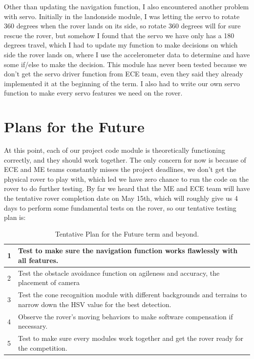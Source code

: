 \documentclass[10pt,letterpaper,onecolumn,draftclsnofoot,journal]{IEEEtran}
\begin{document}
Other than updating the navigation function, I also encountered another problem with servo. Initially in the landonside module, I was letting the servo to rotate 360 degrees when the rover lands on its side, so rotate 360 degrees will for sure rescue the rover, but somehow I found that the servo we have only has a 180 degrees travel, which I had to update my function to make decisions on which side the rover lands on, where I use the accelerometer data to determine and have some if/else to make the decision. This module has never been tested because we don't get the servo driver function from ECE team, even they said they already implemented it at the beginning of the term. I also had to write our own servo function to make every servo features we need on the rover.
\par

\section{\textbf{Plans for the Future}}
At this point, each of our project code module is theoretically functioning correctly, and they should work together. The only concern for now is because of ECE and ME teams constantly misses the project deadlines, we don't get the physical rover to play with, which led we have zero chance to run the code on the rover to do further testing. By far we heard that the ME and ECE team will have the tentative rover completion date on May 15th, which will roughly give us 4 days to perform some fundamental tests on the rover, so our tentative testing plan is: \par

\begin{table}[h!]
	\centering
	\caption{Tentative Plan for the Future term and beyond.}
	\label{tab:table1}
	\begin{tabular}{l l}
	
		\hline
		1   &Test to make sure the navigation function works flawlessly with all features. \\
		\hline
		2   &Test the obstacle avoidance function on agileness and accuracy, the placement of camera    \\
		\hline
		3   &Test the cone recognition module with different backgrounds and terrains to narrow down the HSV value for the best detection.  \\
		\hline
		4   &Observe the rover's moving behaviors to make software compensation if necessary. \\
		\hline
		5   &Test to make sure every modules work together and get the rover ready for the competition. \\
		\hline
	\end{tabular}
\end{table}
\end{document}
